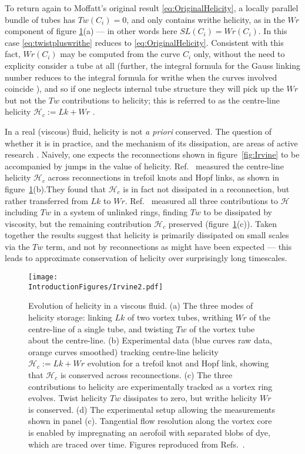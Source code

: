 To return again to Moffatt's original result \eqref{eq:OriginalHelicity}, a locally parallel bundle of tubes has $Tw(C_i) =0$, and only contains writhe helicity, as in the $Wr$ component of figure \ref{fig:Irvine2}(a) --- in other words here $SL(C_i) = Wr(C_i)$. In this case \eqref{eq:twistpluswrithe} reduces to \eqref{eq:OriginalHelicity}. Consistent with this fact, $Wr(C_i)$ may be computed from the curve $C_i$ only, without the need to explicity consider a tube at all (further, the integral formula for the Gauss linking number reduces to the integral formula for writhe when the curves involved coincide \citep{Moffat1992}), and so if one neglects internal tube structure they will pick up the $Wr$ but not the $Tw$ contributions to helicity; this is referred to as the centre-line helicity $\mathcal{H}_c := Lk +Wr$ \citep{Scheeler2014}.

In a real (viscous) fluid, helicity is not \emph{a priori} conserved. The question of whether it is in practice, and the mechanism of its dissipation, are areas of active research \citep{Kleckner2013, Scheeler2014,Scheeler2016}. Naively, one expects the reconnections shown in figure~\ref{fig:Irvine} to be accompanied by jumps in the value of helicity. Ref.~\citep{Scheeler2014} measured the centre-line helicity $\mathcal{H}_c$ across reconnections in trefoil knots and Hopf links, as shown in figure~\ref{fig:Irvine2}(b).They found that $\mathcal{H}_c$ is in fact not dissipated in a reconnection, but rather transferred from $Lk$ to $Wr$. Ref.~\citep{Scheeler2016} measured all three contributions to $\mathcal{H}$ including $Tw$ in a system of unlinked rings, finding $Tw$ to be dissipated by viscosity, but the remaining contribution $\mathcal{H}_c$ preserved (figure~\ref{fig:Irvine2}(c)). Taken together the results suggest that helicity is primarily dissipated on small scales via the $Tw$ term, and not by reconnections as might have been expected --- this leads to approximate conservation of helicity over surprisingly long timescales.
\begin{figure}[htbp]
\centering
\texttt{[image: \\IntroductionFigures/Irvine2.pdf]}
\caption{Evolution of helicity in a viscous fluid. (a) The three modes of helicity storage: linking $Lk$ of two vortex tubes, writhing $Wr$ of the centre-line of a single tube, and twisting $Tw$ of the vortex tube about the centre-line. (b) Experimental data (blue curves raw data, orange curves smoothed) tracking centre-line helicity $\mathcal{H}_c := Lk + Wr$ evolution for a trefoil knot and Hopf link, showing that $\mathcal{H}_c$ is conserved across reconnections. (c) The three contributions to helicity are experimentally tracked as a vortex ring evolves. Twist helicity $Tw$ dissipates to zero, but writhe helicity $Wr$ is conserved. (d) The experimental setup allowing the measurements shown in panel (c). Tangential flow resolution along the vortex core is enabled by impregnating an aerofoil with separated blobs of dye, which are traced over time. Figures reproduced from Refs.~\citep{Scheeler2014, Scheeler2016}. }
\label{fig:Irvine2}
\end{figure}

